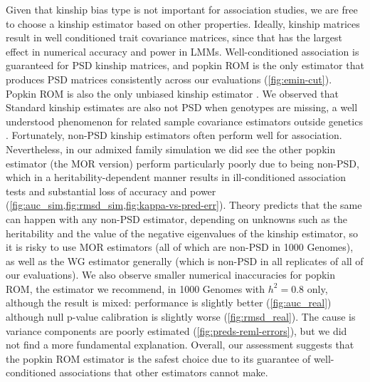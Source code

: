 \documentclass[11pt]{article}
\begin{document}
\begin{linenumbers}
Given that kinship bias type is not important for association studies, we are free to choose a kinship estimator based on other properties.
Ideally, kinship matrices result in well conditioned trait covariance matrices, since that has the largest effect in numerical accuracy and power in LMMs.
Well-conditioned association is guaranteed for PSD kinship matrices, and popkin ROM is the only estimator that produces PSD matrices consistently across our evaluations (\cref{fig:emin-cut}).
Popkin ROM is also the only unbiased kinship estimator \citep{ochoa_estimating_2021}.
We observed that Standard kinship estimates are also not PSD when genotypes are missing, a well understood phenomenon for related sample covariance estimators outside genetics \citep{jurczak_spectral_2017}.
Fortunately, non-PSD kinship estimators often perform well for association.
Nevertheless, in our admixed family simulation we did see the other popkin estimator (the MOR version) perform particularly poorly due to being non-PSD, which in a heritability-dependent manner results in ill-conditioned association tests and substantial loss of accuracy and power (\cref{fig:auc_sim,fig:rmsd_sim,fig:kappa-vs-pred-err}).
Theory predicts that the same can happen with any non-PSD estimator, depending on unknowns such as the heritability and the value of the negative eigenvalues of the kinship estimator, so it is risky to use MOR estimators (all of which are non-PSD in 1000 Genomes), as well as the WG estimator generally (which is non-PSD in all replicates of all of our evaluations).
We also observe smaller numerical inaccuracies for popkin ROM, the estimator we recommend, in 1000 Genomes with $h^2=0.8$ only, although the result is mixed: performance is slightly better (\cref{fig:auc_real}) although null p-value calibration is slightly worse (\cref{fig:rmsd_real}).
The cause is variance components are poorly estimated (\cref{fig:preds-reml-errors}), but we did not find a more fundamental explanation.
Overall, our assessment suggests that the popkin ROM estimator is the safest choice due to its guarantee of well-conditioned associations that other estimators cannot make.


\end{linenumbers}
\end{document}
